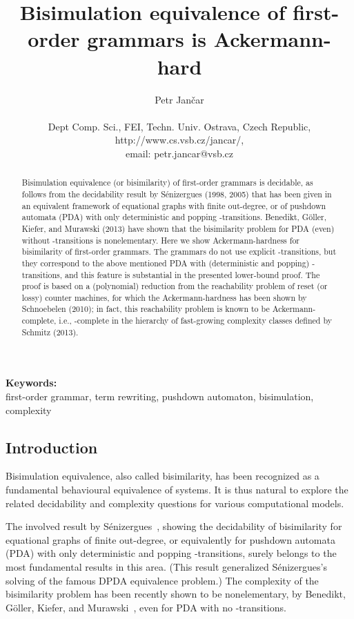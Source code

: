 \documentclass[a4paper,11pt]{article}
\title{Bisimulation equivalence  
	of first-order grammars is Ackermann-hard}
\author{Petr Jan\v{c}ar\\
 \ \\
Dept Comp. Sci., FEI,	Techn. Univ. Ostrava, Czech Republic,
 \\
 http://www.cs.vsb.cz/jancar/,
 \\
 email: petr.jancar@vsb.cz
}
\date{}
\begin{document}
\maketitle


\begin{abstract}
\noindent	
Bisimulation equivalence 
(or bisimilarity)
of
first-order grammars is decidable, as follows from  
the decidability result 
by S\'enizergues (1998, 2005) that has been given
in an equivalent framework of 
equational graphs with finite out-degree, or of 
pushdown automata (PDA)
with
only deterministic and popping -transitions.
Benedikt, G\"oller, Kiefer, and Murawski (2013) have shown that the
bisimilarity problem for PDA (even) without -transitions is
nonelementary. 
Here we show Ackermann-hardness for bisimilarity of first-order grammars. 
The grammars do not use explicit -transitions, but they
correspond to the above mentioned PDA with (deterministic and popping)  
-transitions, and this feature is substantial in the
presented lower-bound proof.
The proof is based on
a (polynomial) reduction from the reachability problem of reset (or
lossy) counter machines, for which  the Ackermann-hardness has been
shown by Schnoebelen (2010); in fact, this reachability problem is known to be 
Ackermann-complete, i.e.,
-complete in the hierarchy of fast-growing
complexity classes defined by Schmitz (2013).
\end{abstract}

\noindent
\textbf{Keywords:}
\\
first-order grammar, term rewriting, pushdown
automaton, bisimulation, complexity 


\subsection*{Introduction}

Bisimulation equivalence, 
also called bisimilarity, has been recognized as a fundamental behavioural equivalence 
of systems. It is thus natural to explore the related decidability and
complexity questions for various computational models. 

The involved result by S\'enizergues~\cite{Seni05}, showing the decidability of
bisimilarity for equational graphs of finite out-degree, or
equivalently for 
pushdown automata (PDA)
with
only deterministic and popping -transitions, surely
belongs to the most fundamental results in this area. (This result
generalized S\'enizergues's solving of the famous DPDA equivalence
problem.)
The complexity of the bisimilarity problem has been recently shown to
be nonelementary, by
Benedikt, G\"oller, Kiefer, and Murawski~\cite{BGKM12}, even for PDA
with no -transitions.
\end{document}
